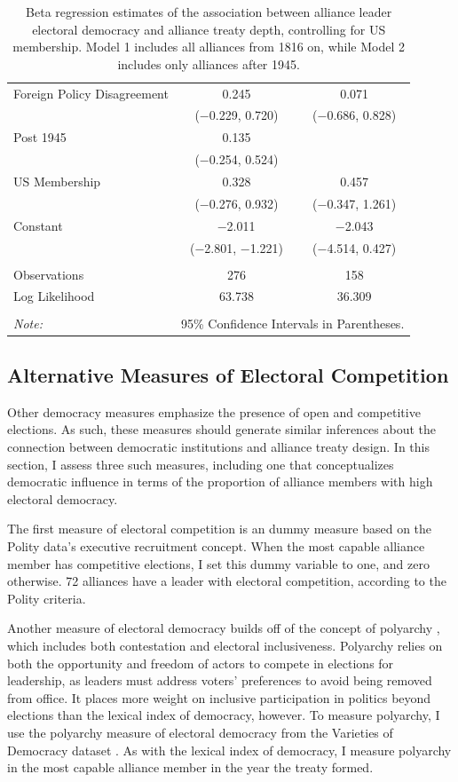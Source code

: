 \documentclass[12pt]{article}
\begin{document}
\begin{table}[!htbp]
\begin{tabular}{@{\extracolsep{5pt}}lcc}
  Foreign Policy Disagreement & 0.245 & 0.071 \\ 
  & ($-$0.229, 0.720) & ($-$0.686, 0.828) \\ 
  Post 1945 & 0.135 &  \\ 
  & ($-$0.254, 0.524) &  \\ 
  US Membership & 0.328 & 0.457 \\ 
  & ($-$0.276, 0.932) & ($-$0.347, 1.261) \\ 
  Constant & $-$2.011$^{}$ & $-$2.043 \\ 
  & ($-$2.801, $-$1.221) & ($-$4.514, 0.427) \\ 
 \hline \\[-1.8ex] 
Observations & 276 & 158 \\ 
Log Likelihood & 63.738 & 36.309 \\ 
\hline 
\hline \\[-1.8ex] 
\textit{Note:}  & \multicolumn{2}{r}{95\% Confidence Intervals in Parentheses.} \\ 
\end{tabular} 
  \caption{Beta regression estimates of the association between alliance leader electoral democracy and alliance treaty depth, controlling for US membership. Model 1 includes all alliances from 1816 on, while Model 2 includes only alliances after 1945.} 
  \label{tab:us-reg}
\end{table} 


\subsection{Alternative Measures of Electoral Competition}


Other democracy measures emphasize the presence of open and competitive elections. 
As such, these measures should generate similar inferences about the connection between democratic institutions and alliance treaty design. 
In this section, I assess three such measures, including one that conceptualizes democratic influence in terms of the proportion of alliance members with high electoral democracy. 


The first measure of electoral competition is an dummy measure based on the Polity data's executive recruitment concept.  
When the most capable alliance member has competitive elections, I set this dummy variable to one, and zero otherwise. 
72 alliances have a leader with electoral competition, according to the Polity criteria. 


Another measure of electoral democracy builds off of the concept of polyarchy \citep{Dahl1971}, which includes both contestation and electoral inclusiveness. 
Polyarchy relies on both the opportunity and freedom of actors to compete in elections for leadership, as leaders must address voters' preferences to avoid being removed from office. 
It places more weight on inclusive participation in politics beyond elections than the lexical index of democracy, however. 
To measure polyarchy, I use the polyarchy measure of electoral democracy from the Varieties of Democracy dataset \citep{Teorelletal2016}.
As with the lexical index of democracy, I measure polyarchy in the most capable alliance member in the year the treaty formed.
\end{document}

